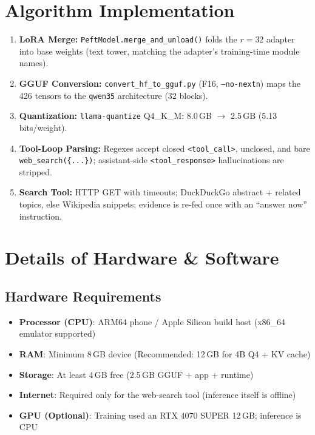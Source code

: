 \documentclass[12pt,a4paper]{report}
\begin{document}
\section{Algorithm Implementation}
\begin{enumerate}
    \item \textbf{LoRA Merge:}
    \texttt{PeftModel.merge\_and\_unload()} folds the $r{=}32$ adapter into base weights (text tower, matching the adapter's training-time module names).
    \item \textbf{GGUF Conversion:}
    \texttt{convert\_hf\_to\_gguf.py} (F16, \texttt{--no-nextn}) maps the 426 tensors to the \texttt{qwen35} architecture (32 blocks).
    \item \textbf{Quantization:}
    \texttt{llama-quantize} Q4\_K\_M: 8.0\,GB $\rightarrow$ 2.5\,GB (5.13 bits/weight).
    \item \textbf{Tool-Loop Parsing:}
    Regexes accept closed \texttt{<tool\_call>}, unclosed, and bare \texttt{web\_search(\{...\})}; assistant-side \texttt{<tool\_response>} hallucinations are stripped.
    \item \textbf{Search Tool:}
    HTTP GET with timeouts; DuckDuckGo abstract + related topics, else Wikipedia snippets; evidence is re-fed once with an ``answer now'' instruction.
\end{enumerate}
\section{Details of Hardware \& Software}

\subsection{Hardware Requirements}
\begin{itemize}[leftmargin=*]
    \item \textbf{Processor (CPU)}: ARM64 phone / Apple Silicon build host (x86\_64 emulator supported)
    \item \textbf{RAM}: Minimum 8\,GB device (Recommended: 12\,GB for 4B Q4 + KV cache)
    \item \textbf{Storage}: At least 4\,GB free (2.5\,GB GGUF + app + runtime)
    \item \textbf{Internet}: Required only for the web-search tool (inference itself is offline)
    \item \textbf{GPU (Optional)}: Training used an RTX 4070 SUPER 12\,GB; inference is CPU
\end{itemize}
\end{document}

